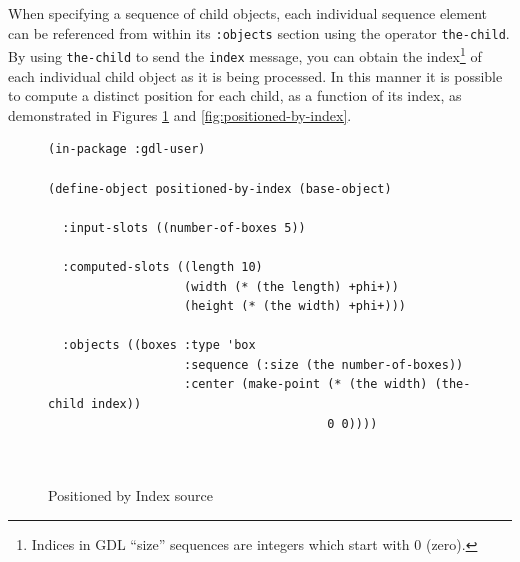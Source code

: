 \documentclass [11pt]{book}
\begin{document}
When specifying a sequence of child objects, each individual sequence element
can be referenced from within its \texttt{:objects} section using the operator \texttt{the-child}. By using \texttt{the-child} to send the \texttt{index} message, you can obtain the index\footnote{Indices in GDL ``size'' sequences are integers which start with 0 (zero).} of each individual child object as it is being processed. 
In this manner it is possible to compute a distinct position for each child, as a function of its
index, as demonstrated in Figures 
\ref{fig:positioned-by-index-source} and 
\ref{fig:positioned-by-index}.\begin{figure}\begin{lrbox}{\boxedverb}
\begin{minipage}{\linewidth}\begin{verbatim}(in-package :gdl-user)

(define-object positioned-by-index (base-object)
  
  :input-slots ((number-of-boxes 5))

  :computed-slots ((length 10)
                   (width (* (the length) +phi+))
                   (height (* (the width) +phi+)))

  :objects ((boxes :type 'box
                   :sequence (:size (the number-of-boxes))
                   :center (make-point (* (the width) (the-child index))
                                       0 0))))
            
                 

\end{verbatim}\end{minipage}
\end{lrbox}
\fbox{\usebox{\boxedverb}}

\caption{Positioned by Index source}

\label{fig:positioned-by-index-source}

\end{figure}
\end{document}
